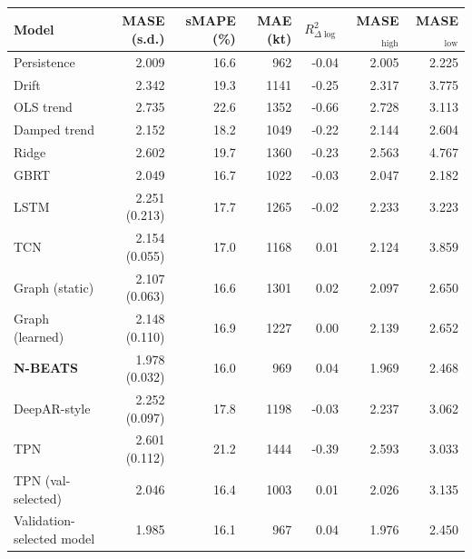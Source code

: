 \begin{tabular}{@{}lrrrrrr@{}}
\toprule
Model & MASE (s.d.) & sMAPE (\%) & MAE (kt) & $R^2_{\Delta\log}$ & MASE$_{\mathrm{high}}$ & MASE$_{\mathrm{low}}$ \\
\midrule
Persistence & 2.009 & 16.6 & 962 & -0.04 & 2.005 & 2.225 \\
Drift & 2.342 & 19.3 & 1141 & -0.25 & 2.317 & 3.775 \\
OLS trend & 2.735 & 22.6 & 1352 & -0.66 & 2.728 & 3.113 \\
Damped trend & 2.152 & 18.2 & 1049 & -0.22 & 2.144 & 2.604 \\
\midrule
Ridge & 2.602 & 19.7 & 1360 & -0.23 & 2.563 & 4.767 \\
GBRT & 2.049 & 16.7 & 1022 & -0.03 & 2.047 & 2.182 \\
\midrule
LSTM & 2.251 (0.213) & 17.7 & 1265 & -0.02 & 2.233 & 3.223 \\
TCN & 2.154 (0.055) & 17.0 & 1168 & 0.01 & 2.124 & 3.859 \\
Graph (static) & 2.107 (0.063) & 16.6 & 1301 & 0.02 & 2.097 & 2.650 \\
Graph (learned) & 2.148 (0.110) & 16.9 & 1227 & 0.00 & 2.139 & 2.652 \\
\textbf{N-BEATS} & 1.978 (0.032) & 16.0 & 969 & 0.04 & 1.969 & 2.468 \\
DeepAR-style & 2.252 (0.097) & 17.8 & 1198 & -0.03 & 2.237 & 3.062 \\
TPN & 2.601 (0.112) & 21.2 & 1444 & -0.39 & 2.593 & 3.033 \\
\midrule
TPN (val-selected) & 2.046 & 16.4 & 1003 & 0.01 & 2.026 & 3.135 \\
Validation-selected model & 1.985 & 16.1 & 967 & 0.04 & 1.976 & 2.450 \\
\bottomrule
\end{tabular}
